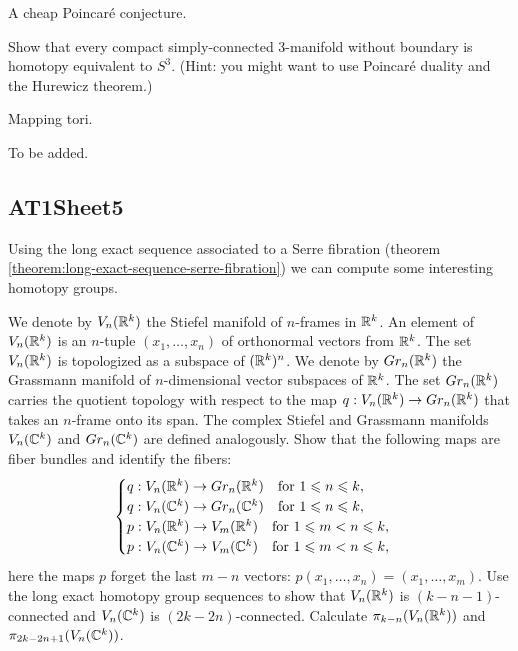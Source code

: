 A cheap Poincaré conjecture.

\label{exercise:AT1Sheet4.2}
Show that every compact simply-connected 3-manifold without boundary
is homotopy equivalent to $S^3$. (Hint: you might want to use Poincaré duality and the
Hurewicz theorem.)

\begin{sketch}
\end{sketch}

Mapping tori.

\label{exercise:AT1Sheet4.3}
To be added.

\begin{sketch}
\end{sketch}

\subsection{AT1Sheet5}

Using the long exact sequence associated to a Serre fibration (theorem \ref{theorem:long-exact-sequence-serre-fibration}) we can compute some interesting homotopy groups.

\label{exercise:AT1Sheet5.1}
We denote by $V_{n}({\mathbb R}^{k})$ the Stiefel manifold of $n$-frames in ${\mathbb R}^{k}$. An element of $V_{n}({\mathbb R}^{k})$ is an $n$-tuple $(x_{1}, \ldots, x_{n})$ of orthonormal vectors from ${\mathbb R}^{k}$. The set $V_{n}({\mathbb R}^{k})$ is topologized as a subspace of $({\mathbb R}^{k})^{n}$. We denote by $Gr_n({\mathbb R}^k)$ the Grassmann manifold of $n$-dimensional vector subspaces of ${\mathbb R}^{k}$. The set $Gr_n({\mathbb R}^k)$ carries the quotient topology with respect to the map $q: V_n({\mathbb R}^k) \rightarrow Gr_n({\mathbb R}^k)$ that takes an $n$-frame onto its span. The complex Stiefel and Grassmann manifolds $V_{n}(\mathbb{C}^{k})$ and $Gr_{n}(\mathbb{C}^{k})$ are defined analogously. Show that the following maps are fiber bundles and identify the fibers:
\begin{equation*}
\begin{cases}
q: V_n({\mathbb R}^k) \rightarrow Gr_n({\mathbb R}^k) \quad \text{for } 1 \leqslant n \leqslant k, \\
q: V_{n}(\mathbb{C}^{k}) \rightarrow Gr_{n}(\mathbb{C}^{k}) \quad \text{for } 1 \leqslant n \leqslant k, \\
p: V_n({\mathbb R}^k) \rightarrow V_{m}({\mathbb R}^{k}) \quad \text{for } 1 \leqslant m < n \leqslant k, \\
p: V_{n}(\mathbb{C}^{k}) \rightarrow V_{m}(\mathbb{C}^{k}) \quad \text{for } 1 \leqslant m < n \leqslant k,
\end{cases}
\end{equation*}
here the maps $p$ forget the last $m-n$ vectors: $p(x_{1}, \ldots, x_{n}) = (x_{1}, \ldots, x_{m})$. Use the long exact homotopy group sequences to show that $V_n({\mathbb R}^k)$ is $(k - n - 1)$-connected and $V_{n}(\mathbb{C}^{k})$ is $(2k - 2n)$-connected. Calculate $\pi_{k-n}(V_n({\mathbb R}^k))$ and $\pi_{2k - 2n + 1}(V_{n}(\mathbb{C}^{k}))$.

